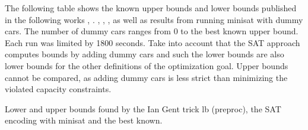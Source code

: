 \documentclass[]{llncs}
\begin{document}
The following table shows the known upper bounds and lower bounds published in the following works \cite{Regin97},
\cite{Gent98}. \cite{Gottlieb03}, \cite{Gravel05}, \cite{Estellon06}, as well as results from running minisat with dummy
cars. The number of dummy cars ranges from 0 to the best known upper bound. Each run was limited by 1800 seconds. Take
into account that the SAT approach computes bounds by adding dummy cars and such the lower bounds are also lower bounds
for the other definitions of the optimization goal. Upper bounds cannot be compared, as adding dummy cars is less strict
than minimizing the violated capacity constraints.

\begin{table}[htbp]
    \caption{Lower and upper bounds found by the Ian Gent trick lb (preproc), the SAT encoding with minisat and the best known.}
    \centering
    
    \label{tab:1}
\end{table}



\end{document}
